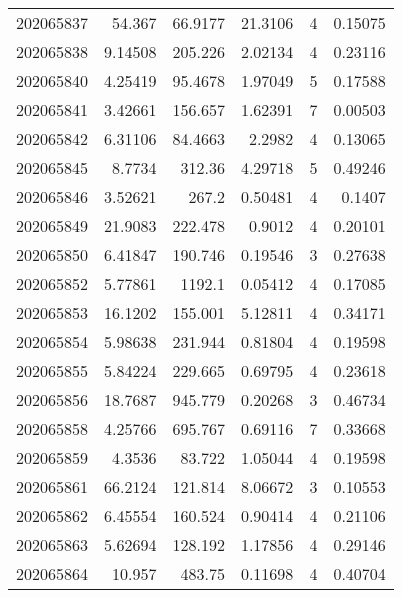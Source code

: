 \begin{tabular}{rrrrrr}
 202065837 &         54.367   &       66.9177 &           21.3106  &           4 & 0.15075 \\
 202065838 &          9.14508 &      205.226  &            2.02134 &           4 & 0.23116 \\
 202065840 &          4.25419 &       95.4678 &            1.97049 &           5 & 0.17588 \\
 202065841 &          3.42661 &      156.657  &            1.62391 &           7 & 0.00503 \\
 202065842 &          6.31106 &       84.4663 &            2.2982  &           4 & 0.13065 \\
 202065845 &          8.7734  &      312.36   &            4.29718 &           5 & 0.49246 \\
 202065846 &          3.52621 &      267.2    &            0.50481 &           4 & 0.1407  \\
 202065849 &         21.9083  &      222.478  &            0.9012  &           4 & 0.20101 \\
 202065850 &          6.41847 &      190.746  &            0.19546 &           3 & 0.27638 \\
 202065852 &          5.77861 &     1192.1    &            0.05412 &           4 & 0.17085 \\
 202065853 &         16.1202  &      155.001  &            5.12811 &           4 & 0.34171 \\
 202065854 &          5.98638 &      231.944  &            0.81804 &           4 & 0.19598 \\
 202065855 &          5.84224 &      229.665  &            0.69795 &           4 & 0.23618 \\
 202065856 &         18.7687  &      945.779  &            0.20268 &           3 & 0.46734 \\
 202065858 &          4.25766 &      695.767  &            0.69116 &           7 & 0.33668 \\
 202065859 &          4.3536  &       83.722  &            1.05044 &           4 & 0.19598 \\
 202065861 &         66.2124  &      121.814  &            8.06672 &           3 & 0.10553 \\
 202065862 &          6.45554 &      160.524  &            0.90414 &           4 & 0.21106 \\
 202065863 &          5.62694 &      128.192  &            1.17856 &           4 & 0.29146 \\
 202065864 &         10.957   &      483.75   &            0.11698 &           4 & 0.40704 \\

\end{tabular}
